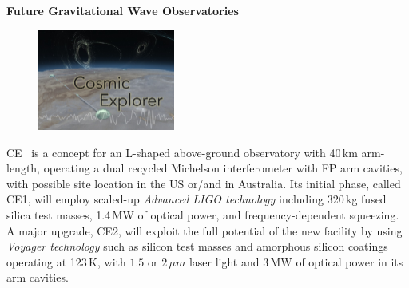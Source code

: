 \begin{DetBox}{\bf Future Gravitational Wave Observatories}
\begin{tcolorbox}[standard jigsaw,colframe=antiquefuchsia!80!black,colback=antiquefuchsia!20!white,opacityback=0.6,coltext=black,size=small, title=Cosmic Explorer (CE)] 
\begin{figure}
\vspace{-10pt}
\includegraphics*[width=0.4\textwidth]{Figures/CE_Thumb.jpg}
\label{fig:CE_Thumb}
\vspace{-20pt}
\end{figure}
CE~\cite{CosmicExplorer2017} is a concept for an L-shaped above-ground observatory with 40\,km arm-length, operating a dual recycled Michelson interferometer with \ac{FP}  arm cavities, with possible site location in the US or/and in Australia. 
Its initial phase, called CE1, will employ scaled-up \emph{Advanced LIGO technology} including 320\,kg fused silica test masses, 1.4\,MW of optical power, and frequency-dependent squeezing. 
A major upgrade, CE2, will exploit the full potential of the new facility by using \emph{Voyager technology} such as silicon test masses and amorphous silicon coatings operating at 123\,K, with $1.5$ or $2\,\mu m$ laser light and 3\,MW of optical power in its arm cavities.

\end{tcolorbox}

\begin{tcolorbox}[standard jigsaw,colframe=azure!70!black,colback=azure!20!white,opacityback=0.6,coltext=black, size=small, title=Voyager]


\end{tcolorbox}
\end{DetBox}
